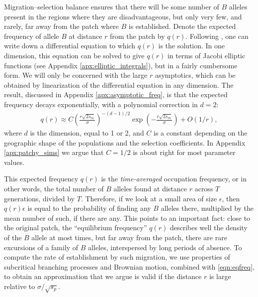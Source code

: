 \documentclass{article}
\begin{document}
Migration--selection balance ensures that 
there will be some number of $B$ alleles present in the regions where they are disadvantageous,
but only very few, and rarely, far away from the patch where $B$ is established.
Denote the expected frequency of allele $B$ at distance $r$ from the patch by $q(r)$.
Following \citet{slatkin1973geneflow}, one can write down a differential equation to which $q(r)$ is the solution.
In one dimension, this equation can be solved to give $q(r)$ in terms of Jacobi elliptic functions (see Appendix \ref{apx:elliptic_integrals}),
but in a fairly cumbersome form.
We will only be concerned with the large $r$ asymptotics,
which can be obtained by linearization of the differential equation in any dimension.
The result, discussed in Appendix \ref{apx:asymptotic_freq}, is that the expected frequency decays exponentially,
with a polynomial correction in $d=2$:
\begin{align} \label{eqn:eqfreq}
  q(r) \approx C \left( \frac{ r \sqrt{2 s_m} }{ \sigma } \right)^{-(d-1)/2} \exp\left( - \frac{ r \sqrt{2 s_m} }{ \sigma } \right) + O(1/r)  ,
\end{align}
where $d$ is the dimension, equal to 1 or 2, 
and $C$ is a constant depending on the geographic shape of the populations and the selection coefficients. 
In Appendix \ref{apx:patchy_sims} we argue that $C=1/2$ is about right for most parameter values.

This expected frequency $q(r)$ is the \emph{time-averaged} occupation frequency,
or in other words, the total number of $B$ alleles found at distance $r$ across $T$ generations, divided by $T$.
Therefore, if we look at a small area of size $\epsilon$, 
then $q(r) \epsilon$ is equal to the probability of finding any $B$ alleles there,
multiplied by the mean number of such, if there are any.
This points to an important fact: 
close to the original patch, the ``equilibrium frequency'' $q(r)$ describes well the density of the $B$ allele at most times,
but far away from the patch, there are rare excursions of a family of $B$ alleles, interspersed by long periods of absence.
To compute the rate of establishment by such migration,
we use properties of subcritical branching processes and Brownian motion,
combined with \eqref{eqn:eqfreq},
to obtain an approximation that we argue is valid if the distance $r$ is large relative to $\sigma/\sqrt{s_p}$.
\end{document}
